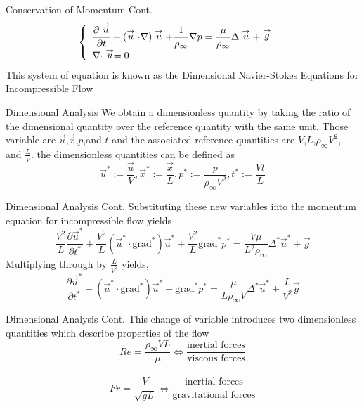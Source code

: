 \documentclass[frames]{prosper}
\begin{document}
\begin{slide}[Dissolve]{Conservation of Momentum Cont.}
\begin{eqnarray*}
\left \{
\begin{array}{l r}
\displaystyle{\frac{\partial \stackrel{\rightarrow}{u}}{\partial t} + (\stackrel{\rightarrow}{u} \cdot \nabla)\stackrel{\rightarrow}{u} + \frac{1}{\rho_{\infty}}\nabla p = \frac{\mu}{\rho_{\infty}}\Delta\stackrel{\rightarrow}{u} + \stackrel{\rightarrow}{g}}\\
\nabla \cdot \stackrel{\rightarrow}{u} = 0 &
\end{array}
\right. 
\end{eqnarray*}
This system of equation is known as the Dimensional Navier-Stokes Equations for Incompressible Flow
\end{slide}

\begin{slide}[Dissolve]{Dimensional Analysis}
We obtain a dimensionless quantity by taking the ratio of the dimensional quantity over the reference quantity with the same unit.
Those variable are $\stackrel{\rightarrow}{u}$,$\stackrel{\rightarrow}{x}$,$p$,and $t$ and the associated reference quantities are $V$,$L$,$\rho_{\infty}V^2$, and $\displaystyle{\frac{L}{V}}$.
the dimensionless quantities can be defined as $$\stackrel{\rightarrow}{u}^* := \frac{\stackrel{\rightarrow}{u}}{V}, \stackrel{\rightarrow}{x}^* := \frac{\stackrel{\rightarrow}{x}}{L}, p^* := \frac{p}{\rho_{\infty}V^2}, t^* := \frac{Vt}{L}$$
\end{slide}

\begin{slide}[Dissolve]{Dimensional Analysis Cont.}
Substituting  these new variables into the momentum equation for incompressible flow yields
$$\frac{V^2}{L}\frac{\partial \stackrel{\rightarrow}{u}^*}{\partial t^*} + \frac{V^2}{L}(\stackrel{\rightarrow}{u}^* \cdot \mbox{grad}^*)\stackrel{\rightarrow}{u}^* + \frac{V^2}{L}\mbox{grad}^* p^* = \frac{V\mu}{L{^2}\rho_{\infty}} \Delta^* \stackrel{\rightarrow}{u}^* + \stackrel{\rightarrow}{g}$$
Multiplying through by $\displaystyle{\frac{L}{V^2}}$ yields, $$\frac{\partial \stackrel{\rightarrow}{u}^*}{\partial t^*} + (\stackrel{\rightarrow}{u}^* \cdot \mbox{grad}^*)\stackrel{\rightarrow}{u}^* + \mbox{grad}^* p^* = \frac{\mu}{L\rho_{\infty}V} \Delta^* \stackrel{\rightarrow}{u}^* + \frac{L}{V^2} \stackrel{\rightarrow}{g}$$
\end{slide}

\begin{slide}[Dissolve]{Dimensional Analysis Cont.}
This change of variable introduces two dimensionless quantities which describe properties of the flow
$$Re = \frac{\rho_{\infty}VL}{\mu} \Leftrightarrow \frac{\mbox{inertial forces}}{\mbox{viscous forces}}$$\\
$$Fr = \frac{V}{\sqrt{gL}} \Leftrightarrow \frac{\mbox{inertial forces}}{\mbox{gravitational forces}}$$
\end{slide}
\end{document}
